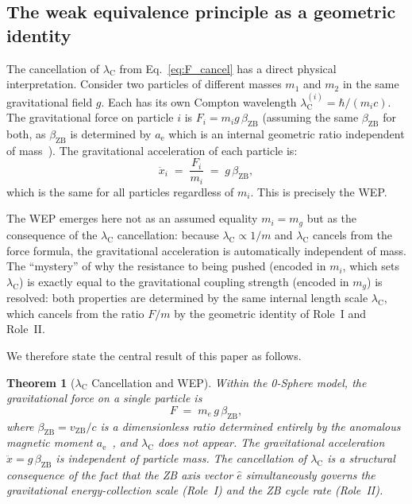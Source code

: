 \documentclass[%
 reprint, amsmath,amssymb, aps, prb, ]{revtex4-2}
\numberwithin{equation}{section}
\newtheorem{theorem}{Theorem}[section]
\newcommand{\lambdaC}{\lambda_{\mathrm{C}}}
\newcommand{\betaZB}{\beta_{\mathrm{ZB}}}
\newcommand{\vZB}{v_{\mathrm{ZB}}}
\newcommand{\anom}{a_{\mathrm{e}}}
\begin{document}
\subsection{The weak equivalence principle as a geometric identity}
\label{subsec:wep_identity}

The cancellation of $\lambdaC$ from Eq.~\eqref{eq:F_cancel} has a direct physical interpretation.
Consider two particles of different masses $m_1$ and $m_2$ in the same gravitational field $g$.
Each has its own Compton wavelength $\lambdaC^{(i)} = \hbar/(m_i c)$.
The gravitational force on particle $i$ is $F_i = m_i g\,\betaZB$ (assuming the same $\betaZB$ for both, as $\betaZB$ is determined by $\anom$ which is an internal geometric ratio independent of mass~\cite{hanamura47}).
The gravitational acceleration of each particle is:
\begin{equation}
\ddot{x}_i \;=\; \frac{F_i}{m_i} \;=\; g\,\betaZB,
\label{eq:wep_derived}
\end{equation}
which is the same for all particles regardless of $m_i$.
This is precisely the WEP.

The WEP emerges here not as an assumed equality $m_i = m_g$ but as the consequence of the $\lambdaC$ cancellation: because $\lambdaC \propto 1/m$ and $\lambdaC$ cancels from the force formula, the gravitational acceleration is automatically independent of mass.
The ``mystery'' of why the resistance to being pushed (encoded in $m_i$, which sets $\lambdaC$) is exactly equal to the gravitational coupling strength (encoded in $m_g$) is resolved: both properties are determined by the same internal length scale $\lambdaC$, which cancels from the ratio $F/m$ by the geometric identity of Role~I and Role~II.

We therefore state the central result of this paper as follows.

\begin{theorem}[$\lambdaC$ Cancellation and WEP]
\label{thm:cancel}
Within the 0-Sphere model, the gravitational force on a single particle is
\begin{equation}
F \;=\; m_e\,g\,\betaZB,
\label{eq:F_theorem}
\end{equation}
where $\betaZB = \vZB/c$ is a dimensionless ratio determined entirely by the anomalous magnetic moment $\anom$~\cite{hanamura10}, and $\lambdaC$ does not appear.
The gravitational acceleration $\ddot{x} = g\,\betaZB$ is independent of particle mass.
The cancellation of $\lambdaC$ is a structural consequence of the fact that the ZB axis vector $\hat{e}$ simultaneously governs the gravitational energy-collection scale (Role~I) and the ZB cycle rate (Role~II).
\end{theorem}
\end{document}
